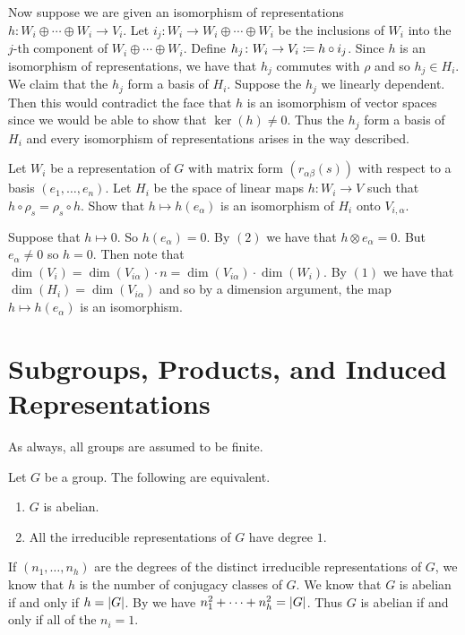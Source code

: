 \documentclass[letterpaper, 11pt, oneside]{book}
\begin{document}
\begin{pf}
\begin{enumerate}
        Now suppose we are given an isomorphism of representations $h\colon W_{i} \oplus \cdots \oplus W_{i} \to V_{i}$.
        Let $i_{j}\colon W_{i} \to W_{i} \oplus \cdots \oplus W_{i}$ be the inclusions of $W_{i}$ into the $j$-th component of $W_{i} \oplus \cdots \oplus W_{i}$.
        Define $h_{j}\colon W_{i} \to V_{i} \coloneqq h \circ i_{j}$.
        Since $h$ is an isomorphism of representations, we have that $h_{j}$ commutes with $\rho$ and so $h_{j} \in H_{i}$.
        We claim that the $h_{j}$ form a basis of $H_{i}$.
        Suppose the $h_{j}$ we linearly dependent.
        Then this would contradict the face that $h$ is an isomorphism of vector spaces since we would be able to show that $\ker(h) \neq 0$.
        Thus the $h_{j}$ form a basis of $H_{i}$ and every isomorphism of representations arises in the way described.
  \end{enumerate}
\end{pf}

\begin{exercise}
  Let $W_{i}$ be a representation of $G$ with matrix form $(r_{\alpha \beta}(s))$ with respect to a basis $(e_{1}, \ldots, e_{n})$.
  Let $H_{i}$ be the space of linear maps $h\colon W_{i} \to V$ such that $h \circ \rho_{s} = \rho_{s} \circ h$.
  Show that $h \mapsto h(e_{\alpha})$ is an isomorphism of $H_{i}$ onto $V_{i, \alpha}$.
\end{exercise}
\begin{pf}
  Suppose that $h \mapsto 0$.
  So $h(e_{\alpha}) = 0$.
  By  $(2)$ we have that $h \otimes e_{\alpha} = 0$.
  But $e_{\alpha} \neq 0$ so $h = 0$.
  Then note that $\dim(V_{i}) = \dim(V_{i \alpha}) \cdot n = \dim(V_{i \alpha}) \cdot \dim(W_{i})$.
  By  $(1)$ we have that $\dim(H_{i}) = \dim(V_{i \alpha})$ and so by a dimension argument, the map $h \mapsto h(e_{\alpha})$ is an isomorphism.
\end{pf}

\chapter{Subgroups, Products, and Induced Representations}

As always, all groups are assumed to be finite.
\begin{thrm}\label{thrm:abelian_iff_all_degree_1}
  Let $G$ be a group.
  The following are equivalent.
  \begin{enumerate}
  \item $G$ is abelian.
  \item All the irreducible representations of $G$ have degree $1$.
  \end{enumerate}
\end{thrm}
\begin{pf}
  If $(n_{1}, \ldots, n_{h})$ are the degrees of the distinct irreducible representations of $G$, we know that $h$ is the number of conjugacy classes of $G$.
  We know that $G$ is abelian if and only if $h = \abs{G}$.
  By  we have $n_{1}^{2} + \cdots + n_{h}^{2} = \abs{G}$.
  Thus $G$ is abelian if and only if all of the $n_{i} = 1$.
\end{pf}
\end{document}
